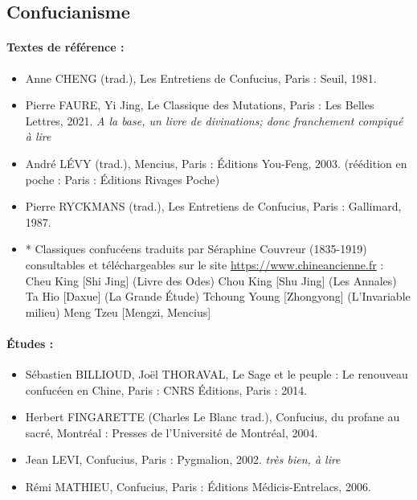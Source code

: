 \subsection{Confucianisme}

\paragraph{Textes de référence :}
\begin{itemize}
    \item Anne CHENG (trad.), Les Entretiens de Confucius, Paris : Seuil, 1981. 
    \item Pierre FAURE, Yi Jing, Le Classique des Mutations, Paris : Les Belles Lettres, 2021. \textit{A la base, un livre de divinations; donc franchement compiqué à lire}
    \item André LÉVY (trad.), Mencius, Paris : Éditions You-Feng, 2003. (réédition en poche  : Paris : Éditions Rivages Poche)
    \item Pierre RYCKMANS (trad.), Les Entretiens de Confucius, Paris : Gallimard, 1987.
    \item * Classiques confucéens traduits par Séraphine Couvreur (1835-1919) consultables et téléchargeables sur le site \url{https://www.chineancienne.fr} :
Cheu King [Shi Jing] (Livre des Odes)
Chou King [Shu Jing] (Les Annales)
Ta Hio [Daxue] (La Grande Étude)
Tchoung Young [Zhongyong] (L’Invariable milieu)
Meng Tzeu [Mengzi, Mencius] 
 

\end{itemize}

\paragraph{Études :}

\begin{itemize}
    \item Sébastien BILLIOUD, Joël THORAVAL, Le Sage et le peuple : Le renouveau confucéen en Chine, Paris : CNRS Éditions, Paris : 2014.  
    \item Herbert FINGARETTE (Charles Le Blanc trad.), Confucius, du profane au sacré, Montréal : Presses de l’Université de Montréal, 2004.
    \item Jean LEVI, Confucius, Paris : Pygmalion, 2002. \textit{très bien, à lire}
    \item Rémi MATHIEU, Confucius, Paris : Éditions Médicis-Entrelacs, 2006.

\end{itemize}





